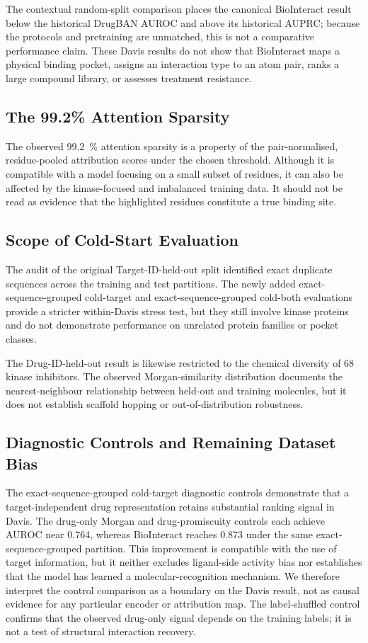 \documentclass[fleqn,10pt]{wlscirep}
\begin{document}
The contextual random-split comparison places the canonical BioInteract result
below the historical DrugBAN AUROC and above its historical AUPRC; because the
protocols and pretraining are unmatched, this is not a comparative performance
claim. These Davis results do not show that
BioInteract maps a physical binding pocket, assigns an interaction type to an
atom pair, ranks a large compound library, or assesses treatment resistance.

\subsection{The 99.2\% Attention Sparsity}

The observed \SI{99.2}{\percent} attention sparsity is a property of the
pair-normalised, residue-pooled attribution scores under the chosen threshold. Although it is
compatible with a model focusing on a small subset of residues, it can also be
affected by the kinase-focused and imbalanced training data.  It should not be
read as evidence that the highlighted residues constitute a true binding site.

\subsection{Scope of Cold-Start Evaluation}

The audit of the original Target-ID-held-out split identified exact duplicate
sequences across the training and test partitions. The newly added exact-sequence-grouped
cold-target and exact-sequence-grouped cold-both evaluations provide a stricter within-Davis stress
test, but they still involve kinase proteins and do not demonstrate performance
on unrelated protein families or pocket classes.

The Drug-ID-held-out result is likewise restricted to the chemical diversity of 68
kinase inhibitors.  The observed Morgan-similarity distribution documents the
nearest-neighbour relationship between held-out and training molecules, but it
does not establish scaffold hopping or out-of-distribution robustness.

\subsection{Diagnostic Controls and Remaining Dataset Bias}

The exact-sequence-grouped cold-target diagnostic controls demonstrate that a target-independent
drug representation retains substantial ranking signal in Davis.  The
drug-only Morgan and drug-promiscuity controls each achieve AUROC near 0.764,
whereas BioInteract reaches 0.873 under the same exact-sequence-grouped
partition.  This improvement is compatible with the use of target information,
but it neither excludes ligand-side activity bias nor establishes that the model
has learned a molecular-recognition mechanism.  We therefore interpret the
control comparison as a boundary on the Davis result, not as causal evidence for
any particular encoder or attribution map.  The label-shuffled control confirms
that the observed drug-only signal depends on the training labels; it is not a
test of structural interaction recovery.
\end{document}
